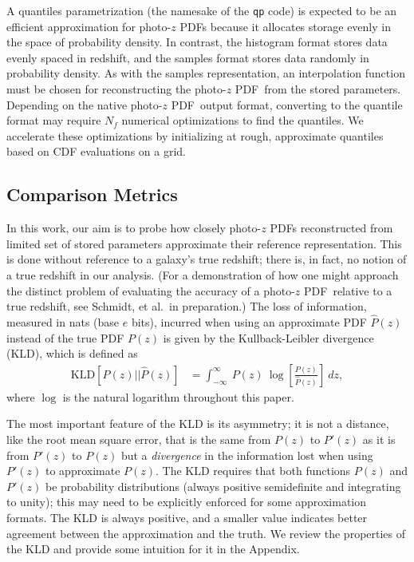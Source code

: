 \documentclass[\docopts]{\docclass}
\newcommand{\pz}{photo-$z$ PDF}
\begin{document}
A quantiles parametrization (the namesake of the \texttt{qp} code) is expected 
to be an efficient approximation for \pz s because it allocates storage evenly 
in the space of probability density.
In contrast, the histogram format stores data evenly spaced in redshift, and 
the samples format stores data randomly in probability density.
As with the samples representation, an interpolation function must be chosen 
for reconstructing the \pz\ from the stored parameters.
Depending on the native \pz\ output format, converting to the quantile format 
may require $N_{f}$ numerical optimizations to find the quantiles.
We accelerate these optimizations by initializing at rough, approximate 
quantiles based on CDF evaluations on a grid.





\subsection{Comparison Metrics}
\label{sec:metric}

In this work, our aim is to probe how closely \pz s reconstructed from limited 
set of stored parameters approximate their reference representation.
This is done without reference to a galaxy's true redshift; there is, in fact, 
no notion of a true redshift in our analysis.
(For a demonstration of how one might approach the distinct problem of 
evaluating the accuracy of a \pz\ relative to a true redshift, see Schmidt, et 
al.\ in preparation.)
The loss of information, measured in nats (base $e$ bits), incurred when using 
an approximate PDF $\hat{P}(z)$ instead of the true PDF $P(z)$ is given by the 
Kullback-Leibler divergence (KLD), which is defined as
\begin{align}
  \label{eq:kld}
  \mathrm{KLD}[P(z) || \hat{P}(z)] &= \int_{-\infty}^{\infty}\ P(z)\ 
\log\left[\frac{P(z)}{\hat{P}(z)}\right]\ dz,
\end{align}
where $\log$ is the natural logarithm throughout this paper.

The most important feature of the KLD is its asymmetry; it is not a distance, 
like the root mean square error, that is the same from $P(z)$ to $P'(z)$ as it 
is from $P'(z)$ to $P(z)$ but a \textit{divergence} in the information lost 
when using $P'(z)$ to approximate $P(z)$.
The KLD requires that both functions $P(z)$ and $P'(z)$ be probability 
distributions (always positive semidefinite and integrating to unity); this may 
need to be explicitly enforced for some approximation formats.
The KLD is always positive, and a smaller value indicates better agreement 
between the approximation and the truth.
We review the properties of the KLD and provide some intuition for it in the 
Appendix.
\end{document}

